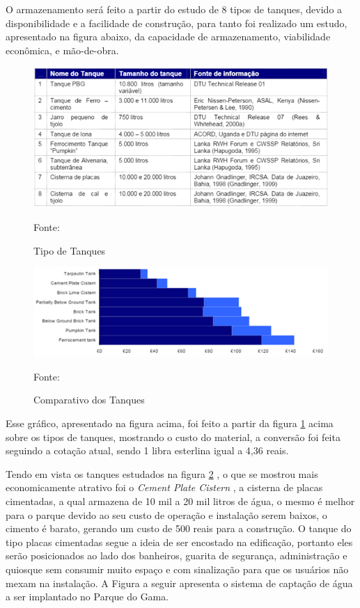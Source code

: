 O armazenamento ser\'a feito a partir do estudo de 8 tipos de tanques, devido a disponibilidade e a facilidade de constru\c{c}\~ao, para tanto foi realizado um estudo, apresentado na figura abaixo, da capacidade de armazenamento, viabilidade econ\^omica, e m\~ao-de-obra.

\begin{figure}[H]
	\centering
	\label{TipoDeTanques}
		\includegraphics[keepaspectratio=true,scale=1.0]{figuras/TipoDeTanques.png}
	\caption{Tipo de Tanques}
	\small{Fonte:  \cite{TERRYTHOMAS}}
\end{figure}

\begin{figure}[H]
	\centering
	\label{ComparativoDosTanques}
		\includegraphics[keepaspectratio=true,scale=1.2]{figuras/ComparativoDosTanques.png}
	\caption{Comparativo dos Tanques}
	\small{Fonte:  \cite{TERRYTHOMAS}}
\end{figure}

 Esse gr\'afico, apresentado na figura acima, foi feito a partir da figura \ref{TipoDeTanques} acima sobre os tipos de tanques, mostrando o custo do material, a convers\~ao foi feita seguindo a cota\c{c}\~ao atual, sendo 1 libra esterlina igual a 4,36 reais.
 
 	Tendo em vista os tanques estudados na figura \ref{ComparativoDosTanques} , o que se mostrou mais economicamente atrativo foi o \textit{Cement Plate Cistern} , a cisterna de placas cimentadas, a qual armazena de 10 mil a 20 mil litros de \'agua, o mesmo \'e melhor para o parque devido ao seu custo de opera\c{c}\~ao e instala\c{c}\~ao serem baixos, o cimento \'e barato, gerando um custo de 500 reais para a constru\c{c}\~ao. O tanque do tipo placas cimentadas segue a ideia de ser encostado na edifica\c{c}\~ao, portanto eles ser\~ao posicionados ao lado dos banheiros, guarita de seguran\c{c}a, administra\c{c}\~ao e quiosque sem consumir muito espa\c{c}o e com sinaliza\c{c}\~ao para que os usu\'arios n\~ao mexam na instala\c{c}\~ao. A Figura a seguir apresenta o sistema de capta\c{c}\~ao de \'agua a ser implantado no Parque do Gama.\cite{JOHANN} 
 

